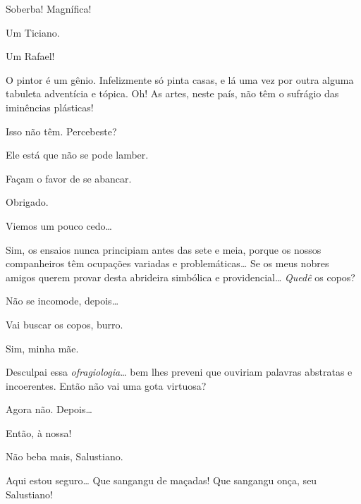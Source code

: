 \begin{linenumbers}
 Soberba! Magnífica!

 Um Ticiano.

 Um Rafael!

 O pintor é um
gênio. Infelizmente só pinta casas, e lá uma vez por outra
alguma tabuleta adventícia e tópica.  Oh! As artes, neste
país, não têm o sufrágio das iminências
plásticas!

 Isso não
têm.  Percebeste?

 
Ele está que não se pode lamber.

 
Façam o favor de se abancar.

 Obrigado. 

 Viemos um pouco cedo\ldots{}

 Sim, os ensaios
nunca principiam antes das sete e meia, porque os nossos companheiros
têm ocupações variadas e problemáticas\ldots{} 
Se os meus nobres amigos querem provar desta abrideira
simbólica e providencial\ldots{}  \textit{Quedê} os copos?

 Não se incomode, depois\ldots{}

 Vai buscar os
copos, burro.

 Sim, minha
mãe. 

 Desculpai essa
\textit{ofragiologia}\ldots{} bem lhes preveni que ouviriam
palavras abstratas e incoerentes. 
Então não vai uma gota virtuosa?

 Agora não. Depois\ldots{}

 Então, à nossa!

 Não beba mais,
Salustiano.




  
Aqui estou seguro\ldots{} Que sangangu de maçadas!
Que sangangu onça, seu Salustiano!


\end{linenumbers}
